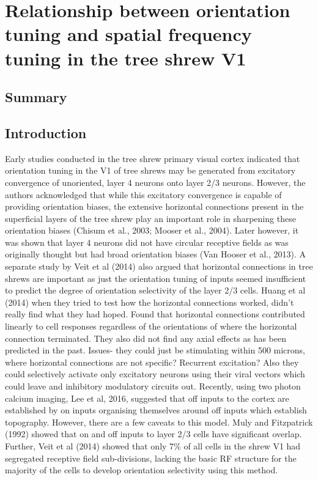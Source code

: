 \chapter [Chapter 5]{Relationship between orientation tuning and spatial frequency tuning in the tree shrew V1}
\pagebreak
\section{Summary}
\pagebreak
\section{Introduction}

Early studies conducted in the tree shrew primary visual cortex indicated that orientation tuning in the V1 of tree shrews may be generated from excitatory convergence of unoriented, layer 4 neurons onto layer 2/3 neurons. However, the authors acknowledged that while this excitatory convergence is capable of providing orientation biases, the extensive horizontal connections present in the superficial layers of the tree shrew play an important role in sharpening these orientation biases (Chisum et al., 2003; Mooser et al., 2004). Later however, it was shown that layer 4 neurons did not have circular receptive fields as was originally thought but had broad orientation biases (Van Hooser et al., 2013). A separate study by Veit et al (2014) also argued that horizontal connections in tree shrews are important as just the orientation tuning of inputs seemed insufficient to predict the degree of orientation selectivity of the layer 2/3 cells.
Huang et al (2014) when they tried to test how the horizontal connections worked, didn’t really find what they had hoped. Found that horizontal connections contributed linearly to cell responses regardless of the orientations of where the horizontal connection terminated. They also did not find any axial effects as has been predicted in the past. Issues- they  could just be stimulating within 500 microns, where horizontal connections are not specific? Recurrent excitation? Also they could selectively activate only excitatory neurons using their viral vectors which could leave and inhibitory modulatory circuits out.
Recently, using two photon calcium imaging, Lee et al, 2016, suggested that off inputs to the cortex are established by on inputs organising themselves around off inputs which establish topography. However, there are a few caveats to this model. Muly and Fitzpatrick (1992) showed that on and off inputs to layer 2/3 cells have significant overlap. Further, Veit et al (2014) showed that only 7\% of all cells in the shrew V1 had segregated receptive field sub-divisions, lacking the basic RF structure for the majority of the cells to develop orientation selectivity using this method. 



